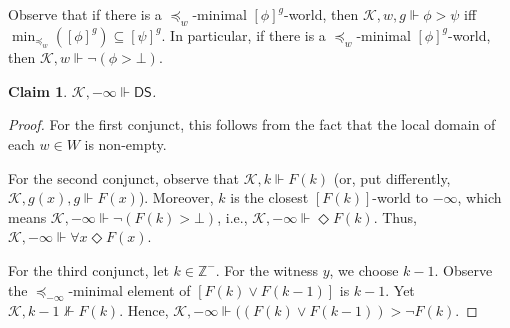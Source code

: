 \documentclass[12pt]{article}
\newtheorem{claim}{Claim}
\newcommand{\would}{\mathbin{>}}
\newcommand{\pos}{\mathop{\Diamond}}
\begin{document}
Observe that if there is a $\preceq_w$-minimal $[\phi]^g$-world, then $\mathcal{K},w,g \Vdash \phi \would \psi$ iff $\min_{\preceq_w}([\phi]^g) \subseteq [\psi]^g$. 
In particular, if there is a $\preceq_w$-minimal $[\phi]^g$-world, then $\mathcal{K},w \Vdash \neg(\phi \would \bot)$.







\begin{claim}\label{descending sequences}
    $\mathcal{K},-\infty\Vdash \mathsf{DS}$.
\end{claim}

\begin{proof}
    For the first conjunct, this follows from the fact that the local domain of each $w \in W$ is non-empty. 
    
    For the second conjunct, observe that $\mathcal{K},k \Vdash F(k)$ (or, put differently, $\mathcal{K},g(x),g \Vdash F(x)$). 
    Moreover, $k$ is the closest $[F(k)]$-world to $-\infty$, which means $\mathcal{K},-\infty \Vdash \neg(F(k) \would \bot)$, i.e., $\mathcal{K},-\infty \Vdash \pos F(k)$.
    Thus, $\mathcal{K},-\infty \Vdash \forall x \pos F(x)$.

    
    For the third conjunct, let $k \in \mathbb{Z}^-$. 
    For the witness $y$, we choose $k-1$. 
    Observe the $\preceq_{-\infty}$-minimal element of $[F(k) \vee F(k-1)]$ is $k-1$. 
    Yet $\mathcal{K},k-1 \nVdash F(k)$. 
    Hence, $\mathcal{K},-\infty \Vdash ((F(k) \vee F(k-1)) \would \neg F(k)$.
\end{proof}
\end{document}
